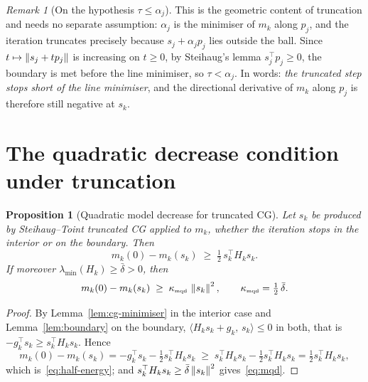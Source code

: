 \documentclass[11pt]{article}
\theoremstyle{plain}
\newtheorem{proposition}[theorem]{Proposition}
\theoremstyle{definition}
\theoremstyle{remark}
\newtheorem{remark}[theorem]{Remark}
\numberwithin{equation}{section}
\newcommand*\mykappa[1]{\kappa_{\scriptscriptstyle\text{#1}}}
\newcommand{\kmqd}{\mykappa{mqd}}
\begin{document}
\begin{remark}[On the hypothesis $\tau \leq \alpha_j$]
    This is the geometric content of truncation and needs no separate assumption: $\alpha_j$ is the
    minimiser of $m_k$ along $p_j$, and the iteration truncates precisely because $s_j + \alpha_jp_j$
    lies outside the ball. Since $t \mapsto \left \lVert s_j + t p_j \right \rVert$ is increasing on $t \geq 0$, by
    Steihaug's lemma $s_j^\top p_j \geq 0$, the boundary is met before the line minimiser, so
    $\tau < \alpha_j$. In words: \emph{the truncated step stops short of the line minimiser}, and
    the directional derivative of $m_k$ along $p_j$ is therefore still negative at $s_k$.
\end{remark}

\section{The quadratic decrease condition under truncation}

\begin{proposition}[Quadratic model decrease for truncated CG]
\label{prop:mqd}
    Let $s_k$ be produced by Steihaug--Toint truncated CG applied to $m_k$, whether the iteration
    stops in the interior or on the boundary. Then
    \begin{equation}
        m_k(0) - m_k(s_k) \;\geq\; \tfrac12\, s_k^\top H_k s_k .
        \label{eq:half-energy}
    \end{equation}
    If moreover $\lambda_{\min}(H_k) \geq \bar\delta > 0$, then
    \begin{equation}
        m_k(0) - m_k(s_k) \;\geq\; \kmqd\,\norm{s_k}^2 ,
        \qquad \kmqd = \tfrac12\,\bar\delta .
        \label{eq:mqd}
    \end{equation}
\end{proposition}

\begin{proof}
    By Lemma~\ref{lem:cg-minimiser} in the interior case and Lemma~\ref{lem:boundary} on the
    boundary,
    $\langle H_ks_k + g_k,\, s_k\rangle \leq 0$ in both, that is
    $-g_k^\top s_k \geq s_k^\top H_k s_k$. Hence
    \begin{equation*}
        m_k(0) - m_k(s_k)
          = -g_k^\top s_k - \tfrac12 s_k^\top H_k s_k
          \;\geq\; s_k^\top H_k s_k - \tfrac12 s_k^\top H_k s_k
          = \tfrac12 s_k^\top H_k s_k ,
    \end{equation*}
    which is~\eqref{eq:half-energy}; and $s_k^\top H_ks_k \geq \bar\delta\left \lVert s_k \right \rVert^2$
    gives~\eqref{eq:mqd}.
\end{proof}
\end{document}
